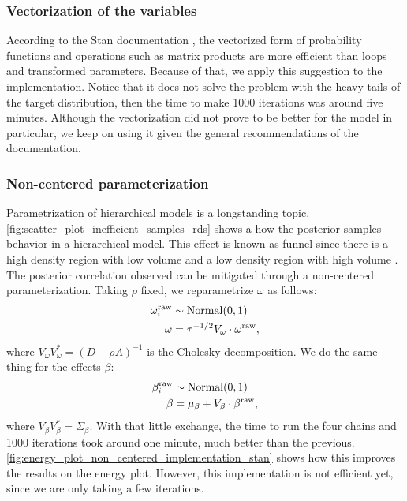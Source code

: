\subsubsection*{Vectorization of the variables}

According to the Stan documentation \cite{stan2021vectorization}, the
vectorized form of probability functions and operations such as matrix
products are more efficient than loops and transformed parameters. Because of
that, we apply this suggestion to the implementation. Notice that it does not
solve the problem with the heavy tails of the target distribution, then the
time to make 1000 iterations was around five minutes. Although the vectorization did
not prove to be better for the model in particular, we keep on using it given
the general recommendations of the documentation.

\subsubsection*{Non-centered parameterization}

Parametrization of hierarchical models is a longstanding topic.
\autoref{fig:scatter_plot_inefficient_samples_rds} shows a how the posterior
samples behavior in a hierarchical model. This effect is known as funnel since
there is a high density region with low volume and a low density region with
high volume \cite[p. 1]{betancourt2015hamiltonian}. The posterior correlation
observed can be mitigated through a non-centered parameterization. Taking
$\rho$ fixed, we reparametrize $\omega$ as follows:
\begin{equation*}
  \begin{split}
    \omega^{\mathrm{raw}}_i &\sim \operatorname{Normal}(0,1) \\
    \omega &= \tau^{-1/2}V_{\omega} \cdot \omega^{\mathrm{raw}},
  \end{split}
\end{equation*}
where $V_{\omega}V_{\omega}^{*} = (D - \rho A)^{-1}$ is the Cholesky decomposition. We do the
same thing for the effects $\beta$:
\begin{equation*}
  \begin{split}
    \beta^{\mathrm{raw}}_i &\sim \operatorname{Normal}(0,1) \\
    \beta &= \mu_{\beta} + V_{\beta} \cdot \beta^{\mathrm{raw}},
  \end{split}
\end{equation*}
where $V_{\beta}V_{\beta}^{*} = \Sigma_{\beta}$. With that little exchange,
the time to run the four chains and 1000 iterations took around one minute, much
better than the previous.
\autoref{fig:energy_plot_non_centered_implementation_stan} shows how this
improves the results on the energy plot. However, this implementation is not
efficient yet, since we are only taking a few iterations.

